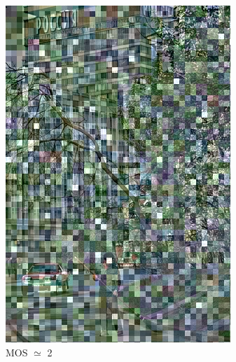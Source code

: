 \documentclass{article}
\begin{document}
\begin{figure}[ht]
\begin{subfigure}{2.9cm}
  \includegraphics[width=0.9\linewidth]{figures/dc_shuffle_chrominance_luminance_76_274007}
  \caption{MOS $\simeq$ 2}
  \label{fig:sub2}
\end{subfigure}
\begin{subfigure}{2.9cm}
  \centering

\end{subfigure}
\end{figure}
\end{document}
